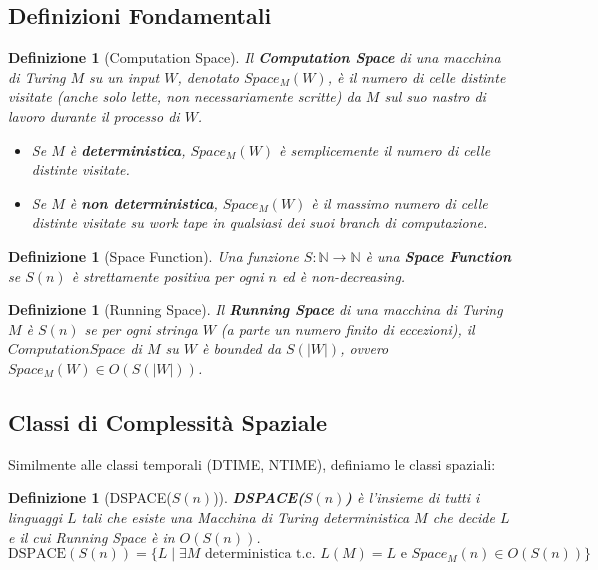 \documentclass[a4paper, 11pt]{book} %
\newtheorem{definition}[theorem]{Definizione}
\theoremstyle{definition}
\begin{document}
\subsection{Definizioni Fondamentali}

\begin{definition}[Computation Space]
Il \textbf{Computation Space} di una macchina di Turing $M$ su un input $W$, denotato $Space_M(W)$, è il numero di celle \emph{distinte} visitate (anche solo lette, non necessariamente scritte) da $M$ sul suo \emph{nastro di lavoro} durante il processo di $W$.
\begin{itemize}
    \item Se $M$ è \textbf{deterministica}, $Space_M(W)$ è semplicemente il numero di celle distinte visitate.
    \item Se $M$ è \textbf{non deterministica}, $Space_M(W)$ è il \emph{massimo} numero di celle distinte visitate su work tape in qualsiasi dei suoi branch di computazione.
\end{itemize}
\end{definition}

\begin{definition}[Space Function]
Una funzione $S: \mathbb{N} \to \mathbb{N}$ è una \textbf{Space Function} se $S(n)$ è strettamente positiva per ogni $n$ ed è non-decreasing.
\end{definition}

\begin{definition}[Running Space]
Il \textbf{Running Space} di una macchina di Turing $M$ è $S(n)$ se per ogni stringa $W$ (a parte un numero finito di eccezioni), il $Computation Space$ di $M$ su $W$ è bounded da $S(|W|)$, ovvero $Space_M(W) \in O(S(|W|))$.
\end{definition}

\subsection{Classi di Complessità Spaziale}

Similmente alle classi temporali (DTIME, NTIME), definiamo le classi spaziali:

\begin{definition}[DSPACE($S(n)$)]
\textbf{DSPACE($S(n)$)} è l'insieme di tutti i linguaggi $L$ tali che esiste una Macchina di Turing deterministica $M$ che decide $L$ e il cui Running Space è in $O(S(n))$.
\[ \text{DSPACE}(S(n)) = \{ L \mid \exists M \text{ deterministica t.c. } L(M) = L \text{ e } Space_M(n) \in O(S(n)) \} \]
\end{definition}
\end{document}
